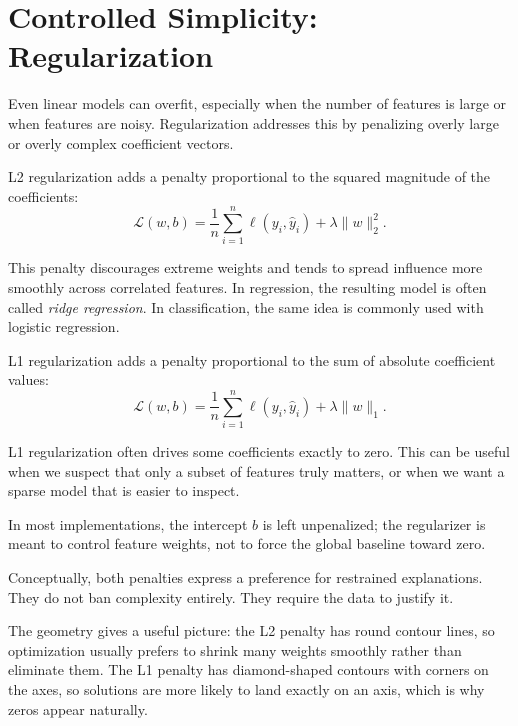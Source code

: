 \section{Controlled Simplicity: Regularization}

Even linear models can overfit, especially when the number of features is large or when features are noisy. Regularization addresses this by penalizing overly large or overly complex coefficient vectors.

\begin{definition}[L2 Regularization]
L2 regularization adds a penalty proportional to the squared magnitude of the coefficients:
\[
\mathcal{L}(w,b) = \frac{1}{n}\sum_{i=1}^{n}\ell(y_i,\hat{y}_i) + \lambda \|w\|_2^2.
\]
\end{definition}

This penalty discourages extreme weights and tends to spread influence more smoothly across correlated features. In regression, the resulting model is often called \emph{ridge regression}. In classification, the same idea is commonly used with logistic regression.

\begin{definition}[L1 Regularization]
L1 regularization adds a penalty proportional to the sum of absolute coefficient values:
\[
\mathcal{L}(w,b) = \frac{1}{n}\sum_{i=1}^{n}\ell(y_i,\hat{y}_i) + \lambda \|w\|_1.
\]
\end{definition}

L1 regularization often drives some coefficients exactly to zero. This can be useful when we suspect that only a subset of features truly matters, or when we want a sparse model that is easier to inspect.

In most implementations, the intercept $b$ is left unpenalized; the regularizer is meant to control feature weights, not to force the global baseline toward zero.

Conceptually, both penalties express a preference for restrained explanations. They do not ban complexity entirely. They require the data to justify it.

The geometry gives a useful picture: the L2 penalty has round contour lines, so optimization usually prefers to shrink many weights smoothly rather than eliminate them. The L1 penalty has diamond-shaped contours with corners on the axes, so solutions are more likely to land exactly on an axis, which is why zeros appear naturally.


